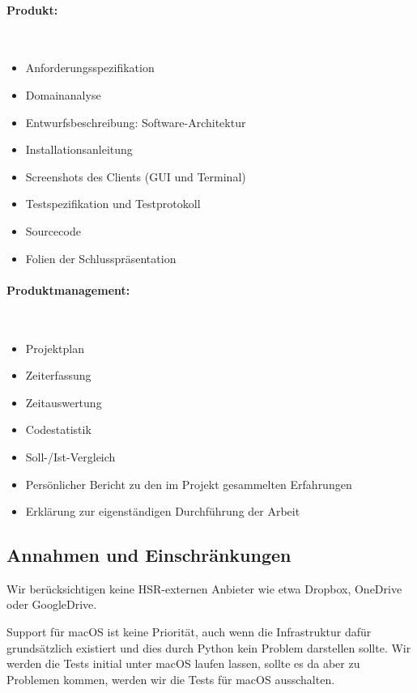 \documentclass[a4paper]{article}
\begin{document}
\begin{multicols}{2}
  \paragraph{Produkt:} \strut \\[-1em]
  \begin{itemize}
    \item Anforderungsspezifikation
    \item Domainanalyse
    \item Entwurfsbeschreibung: Software-Architektur
    \item Installationsanleitung
    \item Screenshots des Clients (GUI und Terminal)
    \item Testspezifikation und Testprotokoll
    \item Sourcecode
    \item Folien der Schlusspräsentation
  \end{itemize}

  \paragraph{Produktmanagement:} \strut \\[-1em]
  \begin{itemize}
    \item Projektplan
    \item Zeiterfassung
    \item Zeitauswertung
    \item Codestatistik
    \item Soll-/Ist-Vergleich
    \item Persönlicher Bericht zu den im Projekt gesammelten Erfahrungen
    \item Erklärung zur eigenständigen Durchführung der Arbeit
  \end{itemize}
\end{multicols}

\subsection{Annahmen und Einschränkungen}
Wir berücksichtigen keine HSR-externen Anbieter wie etwa Dropbox, OneDrive oder GoogleDrive.


Support für macOS ist keine Priorität, auch wenn die Infrastruktur dafür grundsätzlich existiert und dies durch Python kein Problem darstellen sollte. Wir werden die Tests initial unter macOS laufen lassen, sollte es da aber zu Problemen kommen, werden wir die Tests für macOS ausschalten.
\end{document}
